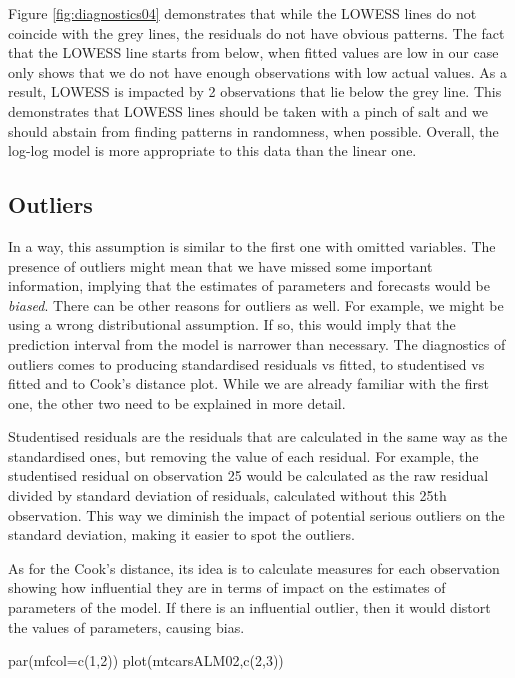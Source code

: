 \documentclass[
]{book}
\newenvironment{Shaded}{\begin{snugshade}}{\end{snugshade}}
\newcommand{\AttributeTok}[1]{\textcolor[rgb]{0.77,0.63,0.00}{#1}}
\newcommand{\DecValTok}[1]{\textcolor[rgb]{0.00,0.00,0.81}{#1}}
\newcommand{\FunctionTok}[1]{\textcolor[rgb]{0.00,0.00,0.00}{#1}}
\newcommand{\NormalTok}[1]{#1}
\theoremstyle{definition}
\theoremstyle{definition}
\theoremstyle{definition}
\theoremstyle{definition}
\theoremstyle{remark}
\begin{document}
Figure \ref{fig:diagnostics04} demonstrates that while the LOWESS lines do not coincide with the grey lines, the residuals do not have obvious patterns. The fact that the LOWESS line starts from below, when fitted values are low in our case only shows that we do not have enough observations with low actual values. As a result, LOWESS is impacted by 2 observations that lie below the grey line. This demonstrates that LOWESS lines should be taken with a pinch of salt and we should abstain from finding patterns in randomness, when possible. Overall, the log-log model is more appropriate to this data than the linear one.

\hypertarget{assumptionsCorrectModelOutliers}{%
\subsection{Outliers}\label{assumptionsCorrectModelOutliers}}

In a way, this assumption is similar to the first one with omitted variables. The presence of outliers might mean that we have missed some important information, implying that the estimates of parameters and forecasts would be \emph{biased}. There can be other reasons for outliers as well. For example, we might be using a wrong distributional assumption. If so, this would imply that the prediction interval from the model is narrower than necessary. The diagnostics of outliers comes to producing standardised residuals vs fitted, to studentised vs fitted and to Cook's distance plot. While we are already familiar with the first one, the other two need to be explained in more detail.

Studentised residuals are the residuals that are calculated in the same way as the standardised ones, but removing the value of each residual. For example, the studentised residual on observation 25 would be calculated as the raw residual divided by standard deviation of residuals, calculated without this 25th observation. This way we diminish the impact of potential serious outliers on the standard deviation, making it easier to spot the outliers.

As for the Cook's distance, its idea is to calculate measures for each observation showing how influential they are in terms of impact on the estimates of parameters of the model. If there is an influential outlier, then it would distort the values of parameters, causing bias.

\begin{Shaded}
\begin{Highlighting}[]
\FunctionTok{par}\NormalTok{(}\AttributeTok{mfcol=}\FunctionTok{c}\NormalTok{(}\DecValTok{1}\NormalTok{,}\DecValTok{2}\NormalTok{))}
\FunctionTok{plot}\NormalTok{(mtcarsALM02,}\FunctionTok{c}\NormalTok{(}\DecValTok{2}\NormalTok{,}\DecValTok{3}\NormalTok{))}
\end{Highlighting}
\end{Shaded}
\end{document}
